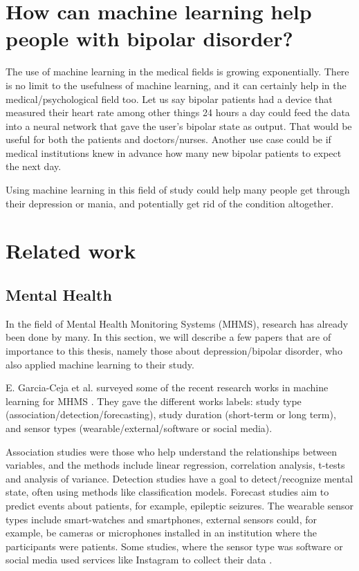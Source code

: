 \section{How can machine learning help people with bipolar disorder?}
The use of machine learning in the medical fields is growing exponentially. There is no limit to the usefulness of machine learning, and it can certainly help in the medical/psychological field too. Let us say bipolar patients had a device that measured their heart rate among other things 24 hours a day could feed the data into a neural network that gave the user's bipolar state as output. That would be useful for both the patients and doctors/nurses. Another use case could be if medical institutions knew in advance how many new bipolar patients to expect the next day. 

Using machine learning in this field of study could help many people get through their depression or mania, and potentially get rid of the condition altogether.

\section{Related work}

\subsection{Mental Health}
In the field of Mental Health Monitoring Systems (MHMS), research has already been done by many. In this section, we will describe a few papers that are of importance to this thesis, namely those about depression/bipolar disorder, who also applied machine learning to their study. 

E. Garcia-Ceja et al. surveyed some of the recent research works in machine learning for MHMS \cite{GarciaCeja2018_survey}. They gave the different works labels: study type (association/detection/forecasting), study duration (short-term or long term), and sensor types (wearable/external/software or social media). 

Association studies were those who help understand the relationships between variables, and the methods include linear regression, correlation analysis, t-tests and analysis of variance. Detection studies have a goal to detect/recognize mental state, often using methods like classification models. Forecast studies aim to predict events about patients, for example, epileptic seizures. The wearable sensor types include smart-watches and smartphones, external sensors could, for example, be cameras or microphones installed in an institution where the participants were patients. Some studies, where the sensor type was software or social media used services like Instagram to collect their data \cite{GarciaCeja2018_survey}. 

